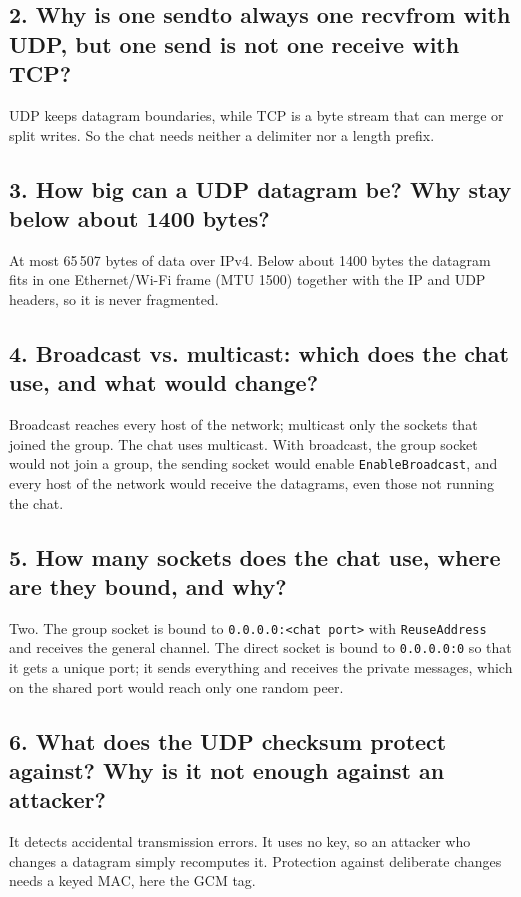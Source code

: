 \documentclass[11pt, a4paper]{article}
\begin{document}
\subsection{2. Why is one sendto always one recvfrom with UDP, but one send is not one receive with TCP?}
UDP keeps datagram boundaries, while TCP is a byte stream that can merge or split writes. So the chat needs neither a delimiter nor a length prefix.

\subsection{3. How big can a UDP datagram be? Why stay below about 1400 bytes?}
At most 65\,507 bytes of data over IPv4. Below about 1400 bytes the datagram fits in one Ethernet/Wi-Fi frame (MTU 1500) together with the IP and UDP headers, so it is never fragmented.

\subsection{4. Broadcast vs. multicast: which does the chat use, and what would change?}
Broadcast reaches every host of the network; multicast only the sockets that joined the group. The chat uses multicast. With broadcast, the group socket would not join a group, the sending socket would enable \texttt{EnableBroadcast}, and every host of the network would receive the datagrams, even those not running the chat.

\subsection{5. How many sockets does the chat use, where are they bound, and why?}
Two. The group socket is bound to \texttt{0.0.0.0:<chat port>} with \texttt{ReuseAddress} and receives the general channel. The direct socket is bound to \texttt{0.0.0.0:0} so that it gets a unique port; it sends everything and receives the private messages, which on the shared port would reach only one random peer.

\subsection{6. What does the UDP checksum protect against? Why is it not enough against an attacker?}
It detects accidental transmission errors. It uses no key, so an attacker who changes a datagram simply recomputes it. Protection against deliberate changes needs a keyed MAC, here the GCM tag.
\end{document}
